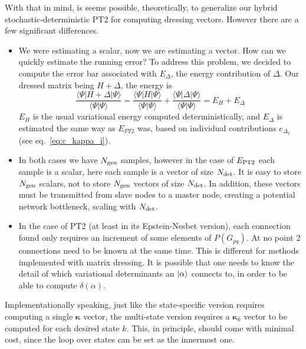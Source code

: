 \documentclass[./thesis.tex]{subfiles}
\begin{document}
With that in mind, is seems possible, theoretically, to generalize our hybrid stochastic-deterministic PT2 for computing dressing vectors.
However there are a few significant differences.
\begin{itemize}
\item
We were estimating a scalar, now we are estimating a vector. How can we quickly estimate the running error?
To address this problem, we decided to compute the error bar associated with $E_{\Delta}$, the energy contribution of $\Delta$. Our dressed matrix being $H + \Delta$, the energy is
\begin{equation}
\frac{\langle \Psi |H + \Delta | \Psi\rangle}{\langle \Psi | \Psi \rangle} = \frac{\langle \Psi |H  | \Psi\rangle}{\langle \Psi | \Psi \rangle} + \frac{\langle \Psi |\Delta | \Psi\rangle}{\langle \Psi | \Psi \rangle} = E_H + E_{\Delta} 
\end{equation}
$E_H$ is the usual variational energy computed deterministically, and $E_{\Delta}$ is estimated the same way as $E_{PT2}$ was, based on individual contributions $e_{\Delta_I}$ (see eq.~\eqref{eq:c_kappa_i}).
\item
In both cases we have ${N_\text{gen}}$ samples, however in the case of $E_\text{PT2}$ each sample is a scalar, here each sample is a vector of size ${N_\text{det}}$. It is easy to store ${N_\text{gen}}$ scalars, not to store ${N_\text{gen}}$ vectors of size ${N_\text{det}}$. In addition, these vectors must be transmitted from slave nodes to a master node, creating a potential network bottleneck, scaling with ${N_\text{det}}$.
\item
In the case of PT2 (at least in its Epstein-Nesbet version), each connection found only requires an increment of some elements of $P(G_{pq})$. At no point 2 connections need to be known at the same time. This is different for methods implemented with matrix dressing. It is possible that one needs to know the detail of which variational determinants an $\ket \alpha$ connects to, in order to be able to compute $\delta(\alpha)$.
\end{itemize}



Implementationally speaking, just like the state-specific version requires computing a single ${\pmb \kappa}$ vector, the multi-state version requires a ${\pmb \kappa}_k$ vector to be computed for each desired state $k$. This, in principle, should come with minimal cost, since the loop over states can be set as the innermost one.

\begin{algorithm}[h!]
\end{algorithm}
\end{document}
